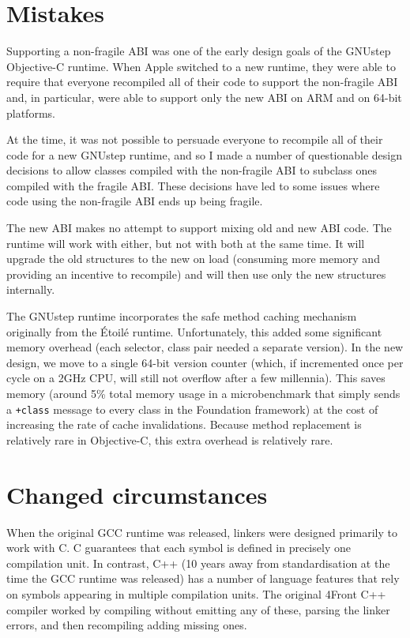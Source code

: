 \documentclass[a4paper]{report}
\newcommand{\objc}[1]{\lstinline[language={[Objective]C}]{#1}}
\begin{document}
\section{Mistakes}

Supporting a non-fragile ABI was one of the early design goals of the GNUstep Objective-C runtime.
When Apple switched to a new runtime, they were able to require that everyone recompiled all of their code to support the non-fragile ABI and, in particular, were able to support only the new ABI on ARM and on 64-bit platforms.

At the time, it was not possible to persuade everyone to recompile all of their code for a new GNUstep runtime, and so I made a number of questionable design decisions to allow classes compiled with the non-fragile ABI to subclass ones compiled with the fragile ABI.
These decisions have led to some issues where code using the non-fragile ABI ends up being fragile.

The new ABI makes no attempt to support mixing old and new ABI code.
The runtime will work with either, but not with both at the same time.
It will upgrade the old structures to the new on load (consuming more memory and providing an incentive to recompile) and will then use only the new structures internally.

The GNUstep runtime incorporates the safe method caching mechanism originally from the Étoilé runtime.
Unfortunately, this added some significant memory overhead (each selector, class pair needed a separate version).
In the new design, we move to a single 64-bit version counter (which, if incremented once per cycle on a 2GHz CPU, will still not overflow after a few millennia).
This saves memory (around 5\% total memory usage in a microbenchmark that simply sends a \objc{+class} message to every class in the Foundation framework) at the cost of increasing the rate of cache invalidations.
Because method replacement is relatively rare in Objective-C, this extra overhead is relatively rare.

\section{Changed circumstances}

When the original GCC runtime was released, linkers were designed primarily to work with C.
C guarantees that each symbol is defined in precisely one compilation unit.
In contrast, C++ (10 years away from standardisation at the time the GCC runtime was released) has a number of language features that rely on symbols appearing in multiple compilation units.
The original 4Front C++ compiler worked by compiling without emitting any of these, parsing the linker errors, and then recompiling adding missing ones.
\end{document}
